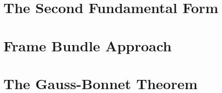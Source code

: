 \documentclass{article}
\begin{document}

\tableofcontents
\newpage

\section{The Second Fundamental Form}

\section{Frame Bundle Approach}

\section{The Gauss-Bonnet Theorem}
\end{document}
